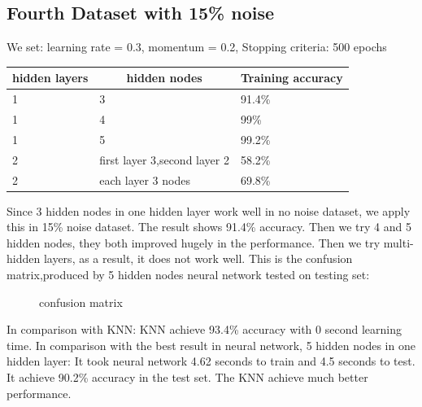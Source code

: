 \documentclass[11pt, a4paper, oneside, openright]{article}
\begin{document}
\subsection{Fourth Dataset with 15\% noise}
We set:  learning rate = 0.3, momentum = 0.2, Stopping criteria: 500 epochs
\begin{table}[H]
\begin{tabular}{|l|l|l|}
\hline
\multicolumn{1}{|c|}{\textbf{hidden layers}} & \multicolumn{1}{c|}{\textbf{hidden nodes}} 
& \multicolumn{1}{c|}{\textbf{Training accuracy}}\\
\hline
1     &3 &91.4\%                                    \\
\hline
1    &4 &99\%                                  \\
\hline
1   &5 &99.2\%                                             \\
\hline
2 &first layer 3,second layer 2  &58.2\%                                            \\
\hline
2  &each layer 3 nodes &69.8\%                                              \\
\hline
\end{tabular}
\end{table}

Since 3 hidden nodes in one hidden layer work well in no noise dataset, we apply this in 15\% noise dataset. The result shows 91.4\% accuracy. Then we try 4 and 5 hidden nodes, they both improved hugely in the performance. Then we try multi-hidden layers, as a result, it does not work well.
This is the confusion matrix,produced by 5 hidden nodes neural network tested on testing set:
  \begin{figure}[!ht]
  \centerline{}
  \caption{confusion matrix}
  \label{fig:confusion}
  \end{figure}
In comparison with KNN:
KNN achieve 93.4\% accuracy with 0 second learning time.
In comparison with the best result in neural network, 5 hidden nodes in one hidden layer: It took neural network 4.62 seconds to train and 4.5 seconds to test. It achieve 90.2\% accuracy in the test set. The KNN achieve much better performance.
\end{document}

